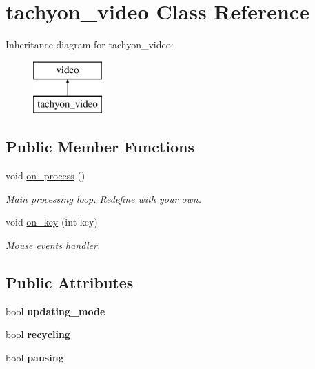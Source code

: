 \hypertarget{classtachyon__video}{}\section{tachyon\+\_\+video Class Reference}
\label{classtachyon__video}
Inheritance diagram for tachyon\+\_\+video\+:\begin{figure}[H]
\begin{center}
\leavevmode
\includegraphics[height=2.000000cm]{classtachyon__video}
\end{center}
\end{figure}
\subsection*{Public Member Functions}
\begin{DoxyCompactItemize}
\item 
\hypertarget{classtachyon__video_ad131903f866941fd35ecdd3f993301dc}{}void \hyperlink{classtachyon__video_ad131903f866941fd35ecdd3f993301dc}{on\+\_\+process} ()\label{classtachyon__video_ad131903f866941fd35ecdd3f993301dc}

\begin{DoxyCompactList}\small\item\em Main processing loop. Redefine with your own. \end{DoxyCompactList}\item 
\hypertarget{classtachyon__video_af67fb4fa50b004b4e3f68b1118f687a9}{}void \hyperlink{classtachyon__video_af67fb4fa50b004b4e3f68b1118f687a9}{on\+\_\+key} (int key)\label{classtachyon__video_af67fb4fa50b004b4e3f68b1118f687a9}

\begin{DoxyCompactList}\small\item\em Mouse events handler. \end{DoxyCompactList}\end{DoxyCompactItemize}
\subsection*{Public Attributes}
\begin{DoxyCompactItemize}
\item 
\hypertarget{classtachyon__video_a407b2dbd1994be670f8b0fe86f0e9702}{}bool {\bfseries updating\+\_\+mode}\label{classtachyon__video_a407b2dbd1994be670f8b0fe86f0e9702}

\item 
\hypertarget{classtachyon__video_aab6a4cfd4e505cf52c18c7cb8c3d3906}{}bool {\bfseries recycling}\label{classtachyon__video_aab6a4cfd4e505cf52c18c7cb8c3d3906}

\item 
\hypertarget{classtachyon__video_ad5af614e0c22d1ef38e7572856753bd1}{}bool {\bfseries pausing}\label{classtachyon__video_ad5af614e0c22d1ef38e7572856753bd1}

\end{DoxyCompactItemize}
